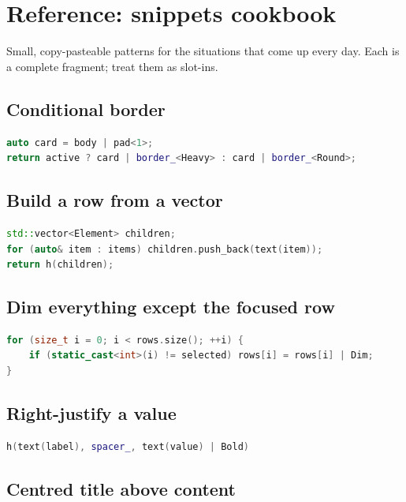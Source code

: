 \chapter{Reference: snippets cookbook}
\label{ch:refman-cookbook}

\begin{aside}
Small, copy-pasteable patterns for the situations that come
up every day. Each is a complete fragment; treat them as
slot-ins.
\end{aside}

\section{Conditional border}

\begin{lstlisting}[language=C++]
auto card = body | pad<1>;
return active ? card | border_<Heavy> : card | border_<Round>;
\end{lstlisting}

\section{Build a row from a vector}

\begin{lstlisting}[language=C++]
std::vector<Element> children;
for (auto& item : items) children.push_back(text(item));
return h(children);
\end{lstlisting}

\section{Dim everything except the focused row}

\begin{lstlisting}[language=C++]
for (size_t i = 0; i < rows.size(); ++i) {
    if (static_cast<int>(i) != selected) rows[i] = rows[i] | Dim;
}
\end{lstlisting}

\section{Right-justify a value}

\begin{lstlisting}[language=C++]
h(text(label), spacer_, text(value) | Bold)
\end{lstlisting}

\section{Centred title above content}

